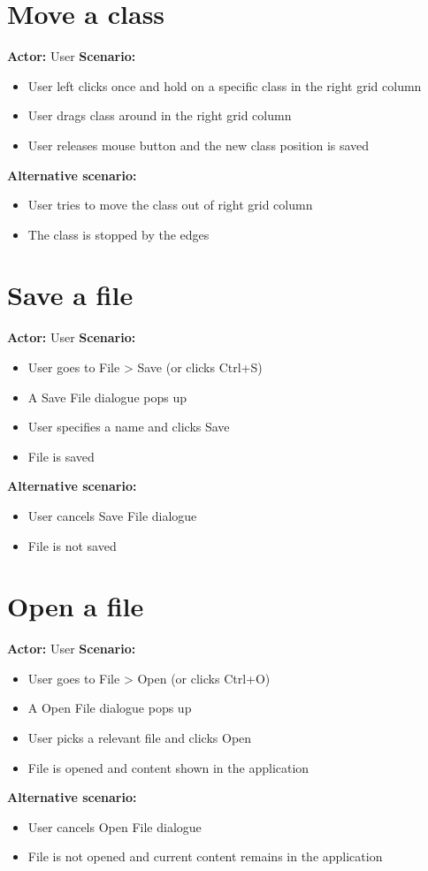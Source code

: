 \section{Move a class}
\textbf{Actor:} User
\textbf{Scenario:}
\begin{itemize}
\item User left clicks once and hold on a specific class in the right grid column
\item User drags class around in the right grid column
\item User releases mouse button and the new class position is saved
\end{itemize}
\textbf{Alternative scenario:} 
\begin{itemize}
\item User tries to move the class out of right grid column
\item The class is stopped by the edges 
\end{itemize}

\section{Save a file}
\textbf{Actor:} User
\textbf{Scenario:}
\begin{itemize}
\item User goes to File > Save (or clicks Ctrl+S)
\item A Save File dialogue pops up
\item User specifies a name and clicks Save
\item File is saved
\end{itemize}
\textbf{Alternative scenario:} 
\begin{itemize}
\item User cancels Save File dialogue
\item File is not saved 
\end{itemize}

\section{Open a file}
\textbf{Actor:} User
\textbf{Scenario:}
\begin{itemize}
\item User goes to File > Open (or clicks Ctrl+O)
\item A Open File dialogue pops up
\item User picks a relevant file and clicks Open
\item File is opened and content shown in the application
\end{itemize}
\textbf{Alternative scenario:} 
\begin{itemize}
\item User cancels Open File dialogue
\item File is not opened and current content remains in the application 
\end{itemize}

